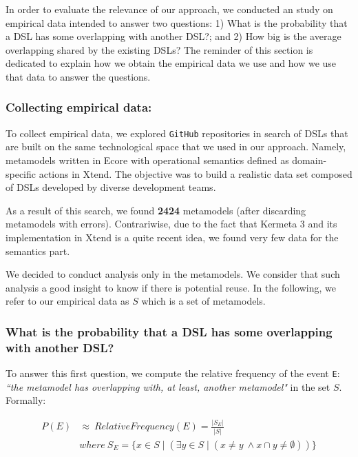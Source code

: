 In order to evaluate the relevance of our approach, we conducted an study on empirical data intended to answer two questions: 1) What is the probability that a DSL has some overlapping with another DSL?; and 2) How big is the average overlapping shared by the existing DSLs? The reminder of this section is dedicated to explain how we obtain the empirical data we use and how we use that data to answer the questions. 

\vspace{-3mm}
\subsubsection{Collecting empirical data:} To collect empirical data, we explored \texttt{GitHub} repositories in search of DSLs that are built on the same technological space that we used in our approach. Namely, metamodels written in Ecore with operational semantics defined as domain-specific actions in Xtend. The objective was to build a realistic data set composed of DSLs developed by diverse development teams. 

As a result of this search, we found \textbf{2424} metamodels (after discarding metamodels with errors). Contrariwise, due to the fact that Kermeta 3 and its implementation in Xtend is a quite recent idea, we found very few data for the semantics part. 

We decided to conduct analysis only in the metamodels. We consider that such analysis a good insight to know if there is potential reuse.  In the following, we refer to our empirical data as $S$ which is a set of metamodels.

\vspace{-3mm}
\subsubsection{What is the probability that a DSL has some overlapping with another DSL?} To answer this first question, we compute the relative frequency of the event \texttt{E}: \textit{``the metamodel has overlapping with, at least, another metamodel"} in the set $S$. Formally:

\begin{equation}
\begin{split}
P(E) & \approx ~ Relative Frequency (E) = \frac{|S_{E}|}{|S|}\\
& where ~ S_{E} = \{x \in S \mid (\exists y \in S \mid (x \neq y ~ \wedge x \cap y \neq \emptyset )) \}
\end{split}
\end{equation}

